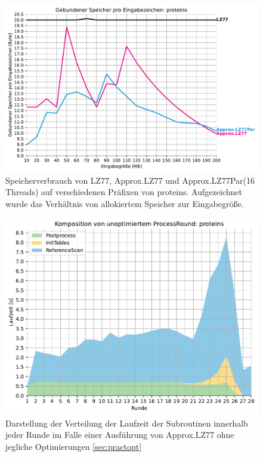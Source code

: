 \begin{figure}[ht]
    \centering
    \caption{Speicherverbrauch von LZ77, Approx.LZ77 und Approx.LZ77Par(16 Threads) auf verschiedenen Präfixen von proteins. Aufgezeichnet wurde das Verhältnis
    von allokiertem Speicher zur Eingabegröße.}
    \label{memory}
    \includegraphics[scale=0.6]{Images/progressive_mem.pdf}
\end{figure}

\begin{figure}[ht]
    \centering
    \caption{Darstellung der Verteilung der Laufzeit der Subroutinen innerhalb jeder Runde im Falle einer Ausführung von Approx.LZ77 ohne jegliche Optimierungen \ref{sec:practopt}}
    \label{unopt}
    \includegraphics[scale=0.6]{Images/progressive_unopt_stack.pdf}
\end{figure}

